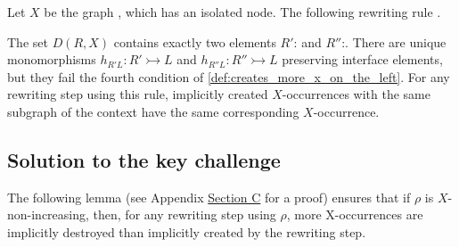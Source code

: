 \begin{example}
    \label{ex:cond4_necessaire}
    Let $X$ be the graph 
    , which has an isolated node. The following rewriting rule .
    \begin{center}
    \end{center}
    The set \( D(R,X) \) contains exactly two elements $R'$:
     and $R''$:. 
    There are unique monomorphisms $h_{R'L}:R' \rightarrowtail L$ and $h_{R''L}:R'' \rightarrowtail L$ preserving interface elements, but they fail the fourth condition of \autoref{def:creates_more_x_on_the_left}.
    For any rewriting step using this rule, implicitly created $X$-occurrences with the same subgraph of the context have the same corresponding $X$-occurrence.
\end{example}


\subsection{Solution to the key challenge}
\label{sec:solution_to_the_key_challenge}
The following lemma (see \iflongversion
Appendix \hyperref[proof:lem:w_u_l_not_geq_r_not]{Section C}
\else
\cite[Lemma 40]{qiu2025termination}
\fi for a proof) ensures that if $\rho$ is $X$-non-increasing, then, for any rewriting step using $\rho$, 
more X-occurrences are implicitly destroyed than implicitly created by the rewriting step.

